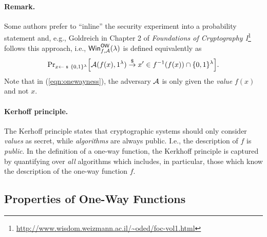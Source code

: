 \documentclass[a4paper,table,dvipsnames]{article}
\theoremstyle{definition}
\begin{document}
\paragraph{Remark.} Some authors prefer to ``inline'' the security experiment into
a probability statement and, e.g., Goldreich in Chapter 2 of \emph{Foundations of Cryptography I}\footnote{\url{http://www.wisdom.weizmann.ac.il/~oded/foc-vol1.html}}
follows this approach, i.e., ${\sf{Win}}_{f,\mathcal{A}}^{{\sf{OW}}}(\lambda)$ is defined equivalently as
\begin{equation}\label{eqn:onewayness}
\probsub{x\sample\bin^\lambda}{\adv(f(x),1^\lambda)\stackrel{\$}{\rightarrow} x'\in f^{-1}(f(x))\cap\bin^\lambda}.
\end{equation}
Note that in (\ref{eqn:onewayness}), the adversary $\mathcal{A}$ is only given the \emph{value} $f(x)$ and not $x$.

\paragraph{Kerhoff principle.} The Kerhoff principle states that cryptographic systems should only consider \emph{values}
as secret, while \emph{algorithms} are always public. I.e., the description of $f$ is \emph{public}. In the definition
of a one-way function, the Kerkhoff principle is captured by quantifying over \emph{all} algorithms which includes, in
particular, those which know the description of the one-way function $f$.

\subsection{Properties of One-Way Functions}
\end{document}
